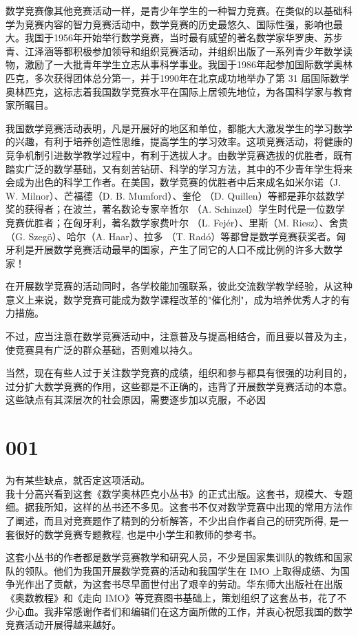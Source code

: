 \documentclass[10pt]{article}
\begin{document}
数学竞赛像其他竞赛活动一样，是青少年学生的一种智力竞赛。在类似的以基础科学为竞赛内容的智力竞赛活动中，数学竞赛的历史最悠久、国际性强，影响也最大。我国于1956年开始举行数学竞赛，当时最有威望的著名数学家华罗庚、苏步青、江泽涵等都积极参加领导和组织竞赛活动，并组织出版了一系列青少年数学读物，激励了一大批青年学生立志从事科学事业。我国于1986年起参加国际数学奥林匹克，多次获得团体总分第一，并于1990年在北京成功地举办了第 31 届国际数学奥林匹克，这标志着我国数学竞赛水平在国际上居领先地位，为各国科学家与教育家所瞩目。

我国数学竞赛活动表明，凡是开展好的地区和单位，都能大大激发学生的学习数学的兴趣，有利于培养创造性思维，提高学生的学习效率。这项竞赛活动，将健康的竞争机制引进数学教学过程中，有利于选拔人才。由数学竞赛选拔的优胜者，既有踏实广泛的数学基础，又有刻苦钻研、科学的学习方法，其中的不少青年学生将来会成为出色的科学工作者。在美国，数学竞赛的优胜者中后来成名如米尔诺（J. W. Milnor）、芒福德（D. B. Mumford）、奎伦 （D. Quillen）等都是菲尔兹数学奖的获得者；在波兰，著名数论专家辛哲尔 （A. Schinzel）学生时代是一位数学竞赛优胜者；在匈牙利，著名数学家费叶尔 （L. Fejér）、里斯（M. Riesz）、舍贵（G. Szegö）、哈尔（A. Haar）、拉多 （T. Radó）等都曾是数学竞赛获奖者。匈牙利是开展数学竞赛活动最早的国家，产生了同它的人口不成比例的许多大数学家！

在开展数学竞赛的活动同时，各学校能加强联系，彼此交流数学教学经验，从这种意义上来说，数学竞赛可能成为数学课程改革的"催化剂"，成为培养优秀人才的有力措施。

不过，应当注意在数学竞赛活动中，注意普及与提高相结合，而且要以普及为主，使竞赛具有广泛的群众基础，否则难以持久。

当然，现在有些人过于关注数学竞赛的成绩，组织和参与都具有很强的功利目的，过分扩大数学竞赛的作用，这些都是不正确的，违背了开展数学竞赛活动的本意。这些缺点有其深层次的社会原因，需要逐步加以克服，不必因

\section*{001}
为有某些缺点，就否定这项活动。\\
我十分高兴看到这套《数学奥林匹克小丛书》的正式出版。这套书，规模大、专题细。据我所知，这样的丛书还不多见。这套书不仅对数学竞赛中出现的常用方法作了阐述，而且对竞赛题作了精到的分析解答，不少出自作者自己的研究所得, 是一套很好的数学竞赛专题教程, 也是中小学生和教师的参考书。

这套小丛书的作者都是数学竞赛教学和研究人员，不少是国家集训队的教练和国家队的领队。他们为我国开展数学竞赛的活动和我国学生在 IMO 上取得成绩、为国争光作出了贡献，为这套书尽早面世付出了艰辛的劳动。华东师大出版社在出版《奥数教程》和《走向 IMO》等竞赛图书基础上，策划组织了这套丛书，花了不少心血。我非常感谢作者们和编辑们在这方面所做的工作，并衷心祝愿我国的数学竞赛活动开展得越来越好。
\end{document}

